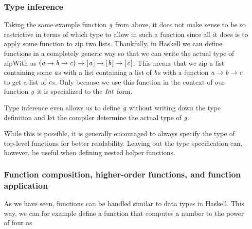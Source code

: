 \documentclass[paper=A4,twoside=true,openright,parskip=full,chapterprefix=true,headings=normal,bibliography=totoc,listof=totoc,titlepage=on,captions=tableabove,draft=false,british]{scrreprt}%
\begin{document}
\hypertarget{type-inference}{%
\subsubsection{Type inference}\label{type-inference}}

Taking the same example function \ensuremath{\Varid{g}} from above, it does not make sense
to be so restrictive in terms of which type to allow in such a function
since all it does is to apply some function to zip two lists.
Thankfully, in Haskell we can define functions in a completely generic
way so that we can write the actual type of zipWith as
\ensuremath{(\Varid{a}\to \Varid{b}\to \Varid{c})\to [\mskip1.5mu \Varid{a}\mskip1.5mu]\to [\mskip1.5mu \Varid{b}\mskip1.5mu]\to [\mskip1.5mu \Varid{c}\mskip1.5mu]}. This means that we zip a list
containing some \ensuremath{\Varid{a}}s with a list containing a list of \ensuremath{\Varid{b}}s with a
function \ensuremath{\Varid{a}\to \Varid{b}\to \Varid{c}} to get a list of \ensuremath{\Varid{c}}s. Only because we use this
function in the context of our function \ensuremath{\Varid{g}} it is specialized to the
\ensuremath{\Conid{Int}} form.

Type inference even allows us to define \ensuremath{\Varid{g}} without writing down the
type definition and let the compiler determine the actual type of \ensuremath{\Varid{g}}.


\begin{hscode}\SaveRestoreHook
{}%
%
\>[B]{}\mathrel{=}\;\<[E]%
\ColumnHook
\end{hscode}\resethooks
\vspace{-2\baselineskip}

While this is possible, it is generally encouraged to always specify the
type of top-level functions for better readability. Leaving out the type
specification can, however, be useful when defining nested helper
functions.

\hypertarget{function-composition-higher-order-functions-and-function-application}{%
\subsubsection{Function composition, higher-order functions, and
function
application}\label{function-composition-higher-order-functions-and-function-application}}

As we have seen, functions can be handled similar to data types in
Haskell. This way, we can for example define a function that computes a
number to the power of four as
\end{document}
